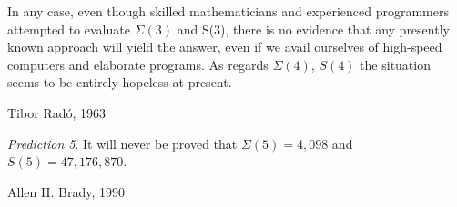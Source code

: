 \documentclass[letterpaper,british,11pt]{article}
\theoremstyle{definition} %
\numberwithin{equation}{section}
\theoremstyle{definition} %
\newcommand{\BBtheFifth}{47{,}176{,}870}
\newcommand{\SigmaTheFifth}{4{,}098}
\newcommand{\radofull}{Tibor Rad\'o\xspace}
\newcommand{\rado}{Rad\'o\xspace}
\begin{document}
\newpage

\begin{center}

\end{center}
\setlength{\epigraphwidth}{0.7\textwidth}
\epigraph{In any case, even though skilled mathematicians and experienced programmers attempted to evaluate $\Sigma(3)$ and S(3), there is no evidence that any presently known approach will yield the answer, even if we avail ourselves of high-speed computers and elaborate programs. As regards $\Sigma(4)$, $S(4)$ the situation seems to be entirely hopeless at present.}{\radofull, 1963 \cite{Rado_1963}}
\vspace{-1em}
\epigraph{\textit{Prediction 5}. It will never be proved that $\Sigma(5) = \SigmaTheFifth$ and $S(5) = \BBtheFifth$.}{Allen H. Brady, 1990 \cite{BradyMeaningOfLife}}
\vspace{2em}



\vspace{-40pt}
\end{document}

